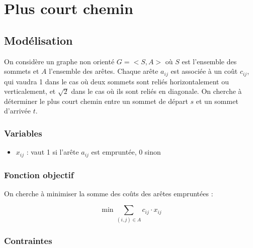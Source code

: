 \chapter{Plus court chemin}
\label{ch:shortest_path}

\section{Modélisation}
\label{sec:shortest_path_model}

On considère un graphe non orienté $G=<S,A>$ où $S$ est l'ensemble des sommets et $A$ l'ensemble des arêtes. Chaque arête $a_{ij}$ est associée à un coût $c_{ij}$, qui vaudra 1 dans le cas où deux sommets sont reliés horizontalement ou verticalement, et $\sqrt{2}$ dans le cas où ils sont reliés en diagonale. On cherche à déterminer le plus court chemin entre un sommet de départ $s$ et un sommet d'arrivée $t$.

\subsection*{Variables}

\begin{itemize}
    \item $x_{ij}$ : vaut 1 si l'arête $a_{ij}$ est empruntée, 0 sinon
\end{itemize}

\subsection*{Fonction objectif}

On cherche à minimiser la somme des coûts des arêtes empruntées :

\begin{equation}
    \min \sum_{(i,j) \in A} c_{ij} \cdot x_{ij}
\end{equation}

\subsection*{Contraintes}

